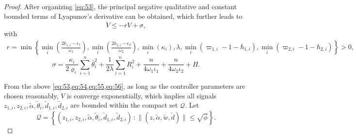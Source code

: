 \documentclass[pdflatex,sn-mathphys-num]{sn-jnl}%
\theoremstyle{thmstyleone}%
\theoremstyle{thmstyletwo}%
\theoremstyle{thmstylethree}%
\begin{document}
\begin{proof}
After organizing \cref{eq:53}, the principal negative qualitative and constant bounded terms of Lyapunov's derivative can be obtained, which further leads to
\begin{equation}\label{eq:54}
\dot{V}\le -r  V+\sigma,
		\end{equation}
with
\begin{equation}\label{eq:55}
\begin{aligned}
r = \min \left\{
	\min_{i}\left(\frac{2 k_{1,i}-\epsilon_1}{\omega_{1}}\right), \min_{i}\left(\frac{2 k_{2,i}-\epsilon_2}{\omega_{2}}\right),
      \min_{i}(\kappa_i), \lambda, \min_{i}\left(\varpi_{1,i}-1-\hbar_{1,i}\right), \min_{i}\left(\varpi_{2,i}-1-\hbar_{2,i}\right)
\right\}>0,
\end{aligned}
\end{equation}
\begin{equation}\label{eq:56}
	\sigma =\frac{\kappa_i}{2\varrho_i}\sum_{i=1}^n \bar \theta_{i}^2 +\frac{1}{2\lambda} \sum_{i=1}^{n}R_{i}^2 + \frac{n}{4  \omega_{1} \iota_1 }+ \frac{n}{4  \omega_{2}\iota_2 }+H.
\end{equation} 



From the above \cref{eq:53,eq:54,eq:55,eq:56}, as long as the controller parameters are chosen reasonably, $V$ is converge exponentially, which implies all signals $z_{1,i}, z_{2,i}, {\tilde{\alpha}}, \tilde \theta_{i}, \tilde{d}_{1,i}, \tilde{d}_{2,i}$ are bounded within the compact set $\mathcal{Q} $. Let
\begin{equation}\label{eq:57}
	\mathcal{Q} =\left\{ (z_{1,i},z_{2,i},\tilde\alpha,\tilde \theta_{i},\tilde d_{1,i},\tilde d_{2,i})\,:
	\|(z,\tilde\alpha,\tilde w,\tilde d)\|\le \sqrt{\phi}\right\}.
\end{equation}



\end{proof}
\end{document}
